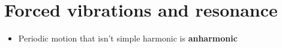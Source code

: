 \documentclass{article}
\begin{document}
\section{Forced vibrations and resonance}

\begin{itemize}
  \item Periodic motion that isn't simple harmonic is \textbf{anharmonic}
\end{itemize}
\end{document}

